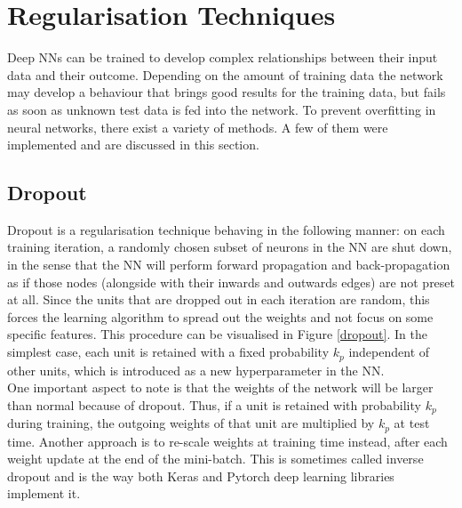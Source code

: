 \section{Regularisation Techniques}

Deep NNs can be trained to develop complex relationships between their input data and their outcome. Depending on the amount of training data the network may develop a behaviour that brings good results for the training data, but fails as soon as unknown test data is fed into the network. To prevent overfitting in neural networks, there exist a variety of methods. A few of them were implemented and are discussed in this section.

\subsection{Dropout}

Dropout is a regularisation technique behaving in the following manner: on each training iteration, a randomly chosen subset of neurons in the NN are shut down, in the sense that the NN will perform forward propagation and back-propagation as if those nodes (alongside with their inwards and outwards edges) are not preset at all. Since the units that are dropped out in each iteration are random, this forces the learning algorithm to spread out the weights and not focus on some specific features. This procedure can be visualised in Figure \ref{dropout}. In the simplest case, each unit is retained with a fixed probability $k_p$ independent of other units, which is introduced as a new hyperparameter in the NN. \\

One important aspect to note is that the weights of the network will be larger than normal because of dropout. Thus, if a unit is retained with probability $k_p$ during training, the outgoing weights of that unit are multiplied by $k_p$ at test
time. Another approach is to re-scale weights at training time instead, after each weight update at the end of the mini-batch. This is sometimes called inverse dropout and is the way both Keras and Pytorch deep learning libraries implement it. \\


